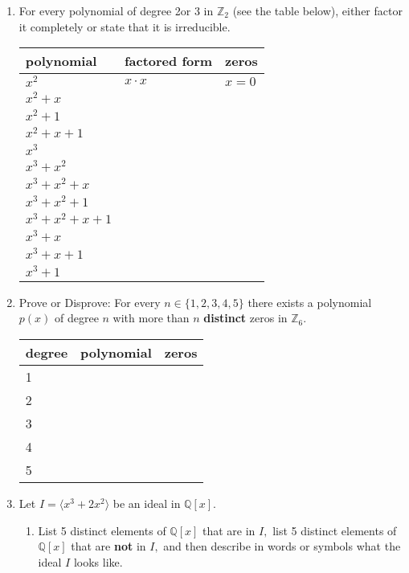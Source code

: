 \documentclass[12pt]{article}
\renewcommand{\emph}[1]{\textsf{\textbf{#1}}}
\newcommand{\bbZ}{\mathbb{Z}}
\newcommand{\bbQ}{\mathbb{Q}}
\begin{document}
\begin{enumerate}
\item For every polynomial of degree 2or 3 in $\bbZ_2$ (see the table below), either factor it completely or state that it is irreducible. \\
\begin{center}
\begin{tabular}{lll}
polynomial & factored form&zeros\\
\hline \hline
$x^2$&$x \cdot x$&$x=0$\\
$x^2+x$&&\\
$x^2+1$&&\\
$x^2+x+1$&&\\
$x^3$&&\\
$x^3+x^2$&&\\
$x^3+x^2+x$&&\\
$x^3+x^2+1$&&\\
$ x^3+x^2+x+1$&&\\
$ x^3+x$&&\\
$x^3+x+1$&&\\
$x^3+1$&&\\
\end{tabular}
\end{center}

\item Prove or Disprove: For every $n \in \{1,2,3,4,5\}$ there exists a polynomial $p(x)$ of degree $n$  with more than $n$ \emph{distinct} zeros in $\bbZ_6.$\\

\begin{center}
\begin{tabular}{lll}
degree & polynomial&zeros\\
\hline \hline
1&&\\
2&&\\
3&&\\
4&&\\
5&&\\
\end{tabular}
\end{center}

\item Let $I=\langle x^3+2x^2 \rangle$ be an ideal in $\bbQ[x].$\\
	\begin{enumerate}
	\item List 5 distinct elements of $\bbQ[x]$ that are in $I,$ list 5 distinct elements of $\bbQ[x]$ that are \emph{not} in $I,$ and then describe in words or symbols what the ideal $I$ looks like. \\
	

\end{enumerate}
\end{enumerate}
\end{document}
